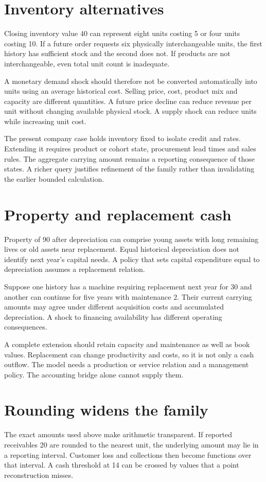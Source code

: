 \section{Inventory alternatives}
Closing inventory value 40 can represent eight units costing 5 or four units costing 10. If a future order requests six physically interchangeable units, the first history has sufficient stock and the second does not. If products are not interchangeable, even total unit count is inadequate.

A monetary demand shock should therefore not be converted automatically into units using an average historical cost. Selling price, cost, product mix and capacity are different quantities. A future price decline can reduce revenue per unit without changing available physical stock. A supply shock can reduce units while increasing unit cost.

The present company case holds inventory fixed to isolate credit and rates. Extending it requires product or cohort state, procurement lead times and sales rules. The aggregate carrying amount remains a reporting consequence of those states. A richer query justifies refinement of the family rather than invalidating the earlier bounded calculation.

\section{Property and replacement cash}
Property of 90 after depreciation can comprise young assets with long remaining lives or old assets near replacement. Equal historical depreciation does not identify next year's capital needs. A policy that sets capital expenditure equal to depreciation assumes a replacement relation.

Suppose one history has a machine requiring replacement next year for 30 and another can continue for five years with maintenance 2. Their current carrying amounts may agree under different acquisition costs and accumulated depreciation. A shock to financing availability has different operating consequences.

A complete extension should retain capacity and maintenance as well as book values. Replacement can change productivity and costs, so it is not only a cash outflow. The model needs a production or service relation and a management policy. The accounting bridge alone cannot supply them.

\section{Rounding widens the family}
The exact amounts used above make arithmetic transparent. If reported receivables 20 are rounded to the nearest unit, the underlying amount may lie in a reporting interval. Customer loss and collections then become functions over that interval. A cash threshold at 14 can be crossed by values that a point reconstruction misses.

